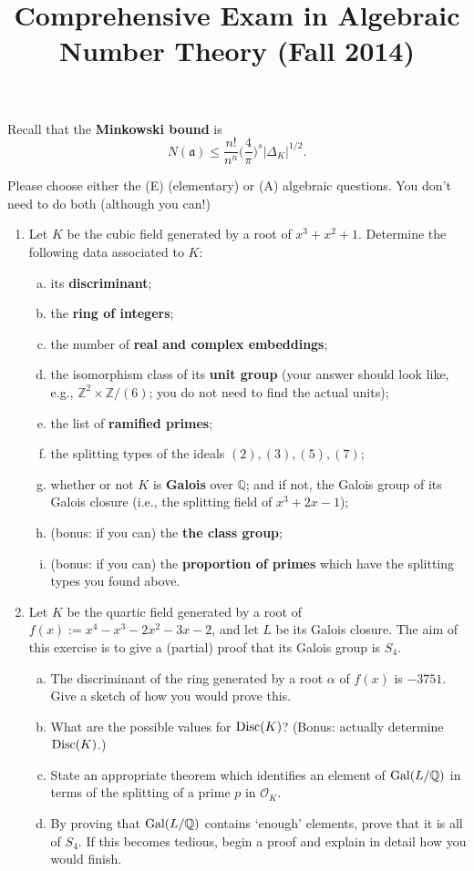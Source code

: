 \documentclass[12pt]{amsart}
\title{Comprehensive Exam in Algebraic Number Theory (Fall 2014)}
\newcommand{\Disc}{{\text {\rm Disc}}}
\newcommand{\Gal}{{\text {\rm Gal}}}
\begin{document}
\maketitle

Recall that the {\bf Minkowski bound} is
\[
N(\mathfrak{a}) \leq \frac{n!}{n^n} \bigg(\frac{4}{\pi}\bigg)^s |\Delta_K|^{1/2}.
\]

Please choose either the (E) (elementary) or (A) algebraic questions. You don't need
to do both (although you can!)

\begin{enumerate}[1.]
\item
Let $K$ be the cubic field generated by a root of $x^3 + x^2 + 1$. Determine the
following data associated to $K$:
\begin{enumerate}[(a)]
\item its {\bf discriminant};
\item the {\bf ring of integers};
\item the number of {\bf real and complex embeddings};
\item the isomorphism class of its {\bf unit group} (your answer should look like,
e.g., $\mathbb{Z}^2 \times \mathbb{Z}/(6)$; you do not need to find the actual units);
\item the list of {\bf ramified primes};
\item the splitting types of the ideals $(2), (3), (5), (7)$;
\item whether or not $K$ is {\bf Galois} over $\mathbb{Q}$; and if not, the Galois group
of its Galois closure (i.e., the splitting field of $x^3 + 2x - 1$);
\item (bonus: if you can) the {\bf the class group};
\item (bonus: if you can) the {\bf proportion of primes} which have the splitting types you found above.
\end{enumerate}
\vskip 0.5cm
\item
Let $K$ be the quartic field generated by a root of $f(x) := x^4 - x^3 - 2x^2 - 3x - 2$,
and let $L$ be its Galois closure. The aim of this exercise is to give a (partial) proof
that its Galois group is $S_4$.
\begin{enumerate}[(a)]
\item
The discriminant of the ring generated by a root $\alpha$ of $f(x)$ is $-3751$. 
Give a sketch of how you would prove this.
\item
What are the possible values for $\Disc(K)$? (Bonus: actually determine $\Disc(K)$.)
\item
State an appropriate theorem which identifies an element of $\Gal(L/\mathbb{Q})$ 
in terms of the splitting of a prime $p$ in $\mathcal{O}_K$.
\item
By proving that $\Gal(L/\mathbb{Q})$ contains `enough' elements, prove that it is all of
$S_4$. If this becomes tedious, begin a proof and explain in detail how you would finish.


\end{enumerate}
\end{enumerate}
\end{document}
